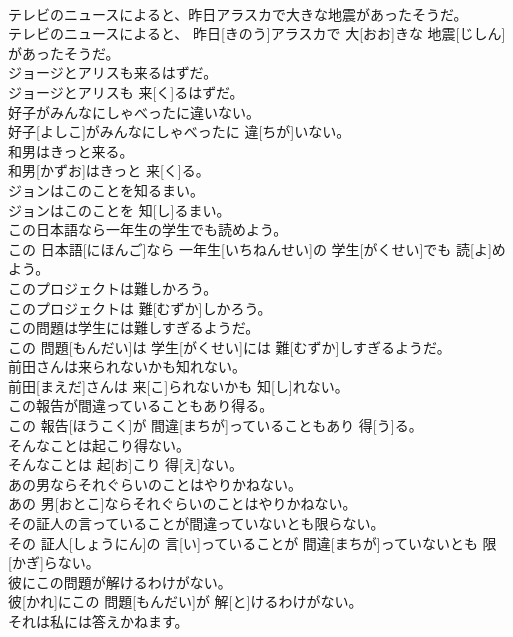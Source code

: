 \documentclass[8pt]{extreport}
\begin{document}
\begin{CJK}{UTF8}{min}
\\	テレビのニュースによると、昨日アラスカで大きな地震があったそうだ。	
\\	テレビのニュースによると、 昨日[きのう]アラスカで 大[おお]きな 地震[じしん]があったそうだ。
\\	ジョージとアリスも来るはずだ。	
\\	ジョージとアリスも 来[く]るはずだ。
\\	好子がみんなにしゃべったに違いない。	
\\	好子[よしこ]がみんなにしゃべったに 違[ちが]いない。
\\	和男はきっと来る。	
\\	和男[かずお]はきっと 来[く]る。
\\	ジョンはこのことを知るまい。	
\\	ジョンはこのことを 知[し]るまい。
\\	この日本語なら一年生の学生でも読めよう。	
\\	この 日本語[にほんご]なら 一年生[いちねんせい]の 学生[がくせい]でも 読[よ]めよう。
\\	このプロジェクトは難しかろう。	
\\	このプロジェクトは 難[むずか]しかろう。
\\	この問題は学生には難しすぎるようだ。	
\\	この 問題[もんだい]は 学生[がくせい]には 難[むずか]しすぎるようだ。
\\	前田さんは来られないかも知れない。	
\\	前田[まえだ]さんは 来[こ]られないかも 知[し]れない。
\\	この報告が間違っていることもあり得る。	
\\	この 報告[ほうこく]が 間違[まちが]っていることもあり 得[う]る。
\\	そんなことは起こり得ない。	
\\	そんなことは 起[お]こり 得[え]ない。
\\	あの男ならそれぐらいのことはやりかねない。	
\\	あの 男[おとこ]ならそれぐらいのことはやりかねない。
\\	その証人の言っていることが間違っていないとも限らない。	
\\	その 証人[しょうにん]の 言[い]っていることが 間違[まちが]っていないとも 限[かぎ]らない。
\\	彼にこの問題が解けるわけがない。	
\\	彼[かれ]にこの 問題[もんだい]が 解[と]けるわけがない。
\\	それは私には答えかねます。	

\end{CJK}
\end{document}
